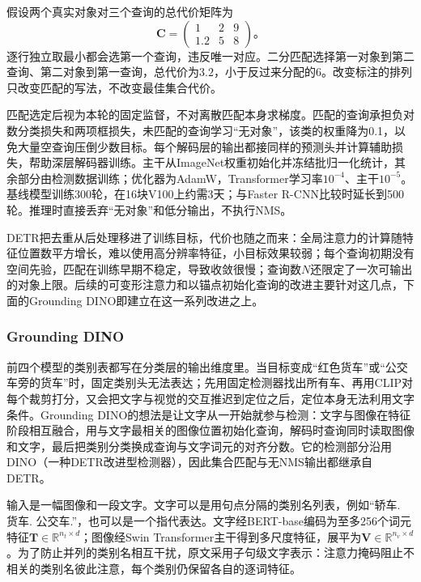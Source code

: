 假设两个真实对象对三个查询的总代价矩阵为
\[
 \bm{C}=\begin{pmatrix}1&2&9\\1.2&5&8\end{pmatrix}\text{。}
\]
逐行独立取最小都会选第一个查询，违反唯一对应。二分匹配选择第一对象到第二查询、第二对象到第一查询，总代价为$3.2$，小于反过来分配的$6$。改变标注的排列只改变匹配的写法，不改变最佳集合代价。

匹配选定后视为本轮的固定监督，不对离散匹配本身求梯度。匹配的查询承担负对数分类损失和两项框损失，未匹配的查询学习“无对象”，该类的权重降为0.1，以免大量空查询压倒少数目标。每个解码层的输出都接同样的预测头并计算辅助损失，帮助深层解码器训练。主干从ImageNet权重初始化并冻结批归一化统计，其余部分由检测数据训练；优化器为AdamW，Transformer学习率$10^{-4}$、主干$10^{-5}$。基线模型训练300轮，在16块V100上约需3天；与Faster R-CNN比较时延长到500轮。推理时直接丢弃“无对象”和低分输出，不执行NMS。

DETR把去重从后处理移进了训练目标，代价也随之而来：全局注意力的计算随特征位置数平方增长，难以使用高分辨率特征，小目标效果较弱；每个查询初期没有空间先验，匹配在训练早期不稳定，导致收敛很慢；查询数$N$还限定了一次可输出的对象上限。后续的可变形注意力和以锚点初始化查询的改进主要针对这几点，下面的Grounding DINO即建立在这一系列改进之上。

\subsubsection{Grounding DINO}
\label{sec:vision-recognition-grounding-dino}

前四个模型的类别表都写在分类层的输出维度里。当目标变成“红色货车”或“公交车旁的货车”时，固定类别头无法表达；先用固定检测器找出所有车、再用CLIP对每个裁剪打分，又会把文字与视觉的交互推迟到定位之后，定位本身无法利用文字条件。Grounding DINO的想法是让文字从一开始就参与检测：文字与图像在特征阶段相互融合，用与文字最相关的图像位置初始化查询，解码时查询同时读取图像和文字，最后把类别分类换成查询与文字词元的对齐分数。它的检测部分沿用DINO（一种DETR改进型检测器），因此集合匹配与无NMS输出都继承自DETR。

输入是一幅图像和一段文字。文字可以是用句点分隔的类别名列表，例如“轿车. 货车. 公交车.”，也可以是一个指代表达。文字经BERT-base编码为至多256个词元特征$\bm{T}\in\mathbb{R}^{n_t\times d}$；图像经Swin Transformer主干得到多尺度特征，展平为$\bm{V}\in\mathbb{R}^{n_v\times d}$。为了防止并列的类别名相互干扰，原文采用子句级文字表示：注意力掩码阻止不相关的类别名彼此注意，每个类别仍保留各自的逐词特征。

